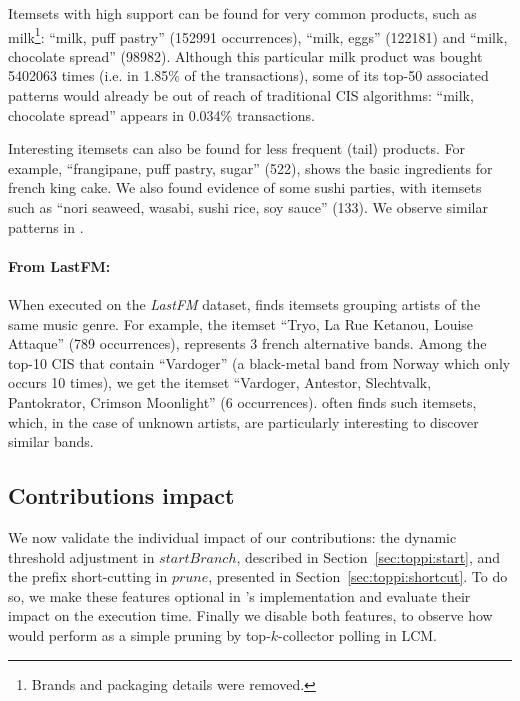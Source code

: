 Itemsets with high support can be found for very common products,
such as milk\footnote{Brands and packaging details were removed.}:
``milk, puff pastry'' (\num{152991} occurrences),
``milk, eggs'' (\num{122181}) and %
``milk, chocolate spread'' (\num{98982}). %
Although this particular milk product was bought \num{5402063} times (i.e. in \num{1,85}\% of the transactions),
some of its top-50 associated patterns would already be out of reach of traditional CIS algorithms: %
``milk, chocolate spread'' appears in \num{0.034}\% transactions.

Interesting itemsets can also be found for less frequent (tail) products.
For example, ``frangipane, puff pastry, sugar'' (\num{522}),
shows the basic ingredients for french king cake.
We also found evidence of some sushi parties, with itemsets such as
``nori seaweed, wasabi, sushi rice, soy sauce'' (\num{133}).
We observe similar patterns in \prodassocclient.


\paragraph{From LastFM:}
When executed on the \emph{LastFM} dataset,
\toppi finds itemsets grouping artists of the same music genre.
For example, the itemset ``Tryo, La Rue Ketanou, Louise Attaque'' (789 occurrences), represents 3 french alternative bands.
Among the top-10 CIS that contain ``Vardoger'' (a black-metal band  from Norway which only occurs 10 times),
we get the itemset ``Vardoger, Antestor, Slechtvalk, Pantokrator, Crimson Moonlight'' (6 occurrences).
\toppi often finds such itemsets, which, in the case of unknown artists, are particularly interesting to discover similar bands.






\subsection{Contributions impact}
\label{sec:toppi:impact}
We now validate the individual impact of our contributions:
the dynamic threshold adjustment in $\mathit{startBranch}$, described in Section~\ref{sec:toppi:start},
and the prefix short-cutting in $\mathit{prune}$, presented in Section~\ref{sec:toppi:shortcut}.
To do so, we make these features optional in \toppi's implementation
and evaluate their impact on the execution time.
Finally we disable both features,
to observe how \toppi would perform as a simple pruning by top-$k$-collector polling in LCM.

